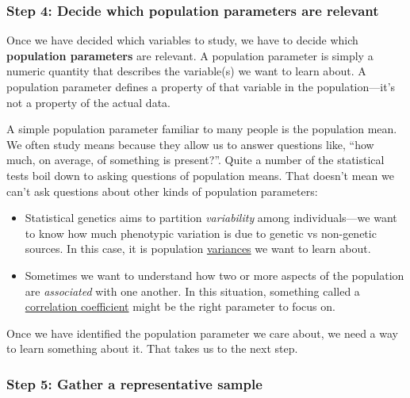 \documentclass[
]{book}
\begin{document}
\hypertarget{step-4-decide-which-population-parameters-are-relevant}{%
\subsubsection*{Step 4: Decide which population parameters are relevant}\label{step-4-decide-which-population-parameters-are-relevant}}

Once we have decided which variables to study, we have to decide which \textbf{population parameters} are relevant. A population parameter is simply a numeric quantity that describes the variable(s) we want to learn about. A population parameter defines a property of that variable in the population---it's not a property of the actual data.

A simple population parameter familiar to many people is the population mean. We often study means because they allow us to answer questions like, ``how much, on average, of something is present?''. Quite a number of the statistical tests boil down to asking questions of population means. That doesn't mean we can't ask questions about other kinds of population parameters:

\begin{itemize}
\item
  Statistical genetics aims to partition \emph{variability} among individuals---we want to know how much phenotypic variation is due to genetic vs non-genetic sources. In this case, it is population \underline{variances} we want to learn about.
\item
  Sometimes we want to understand how two or more aspects of the population are \emph{associated} with one another. In this situation, something called a \underline{correlation coefficient} might be the right parameter to focus on.
\end{itemize}

Once we have identified the population parameter we care about, we need a way to learn something about it. That takes us to the next step.

\hypertarget{step-5-gather-a-representative-sample}{%
\subsubsection*{Step 5: Gather a representative sample}\label{step-5-gather-a-representative-sample}}
\end{document}
